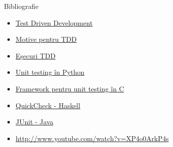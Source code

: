 \documentclass{beamer}
\begin{document}
\begin{frame}{Bibliografie}
  \begin{itemize}
    \item \href{http://www.agiledata.org/essays/tdd.html}{Test Driven Development}
    \item \href{http://www.lispcast.com/uncategorized/6-reasons-to-develop-your-tests-first/}{Motive pentru TDD}
    \item \href{http://stackoverflow.com/questions/301693/why-didnt-unit-testing-work-out-for-your-project}{Eșecuri TDD}
    \item \href{http://docs.python.org/library/unittest.html}{Unit testing în Python}
    \item \href{http://check.sourceforge.net/}{Framework pentru unit testing în C}
    \item \href{http://www.cs.chalmers.se/~rjmh/QuickCheck/}{QuickCheck - Haskell}
    \item \href{http://www.junit.org/}{JUnit - Java}
    \item \href{http://www.youtube.com/watch?v=XP4o0ArkP4s}{http://www.youtube.com/watch?v=XP4o0ArkP4s}
  \end{itemize}
\end{frame}
\end{document}
